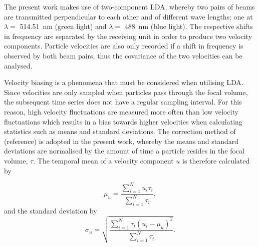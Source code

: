 \documentclass[12pt,oneside,a4paper]{article}
\begin{document}
The present work makes use of two-component LDA, whereby two pairs of beams are transmitted perpendicular to each other and of different wave lengths; one at $\lambda = $ \SI{514.51}{nm} (green light) and $\lambda = $ \SI{488}{nm} (blue light). The respective shifts in frequency are separated by the receiving unit in order to produce two velocity components. Particle velocities are also only recorded if a shift in frequency is observed by both beam pairs, thus the covariance of the two velocities can be analysed. 

Velocity biasing is a phenomena that must be considered when utilising LDA. Since velocities are only sampled when particles pass through the focal volume, the subsequent time series does not have a regular sampling interval. For this reason, high velocity fluctuations are measured more often than low velocity fluctuations which results in a bias towards higher velocities when calculating statistics such as means and standard deviations. The correction method of (reference) is adopted in the present work, whereby the means and standard deviations are normalised by the amount of time a particle resides in the focal volume, $\tau$. The temporal mean of a velocity component $u$ is therefore calculated by

\begin{equation}
\mu_u = \frac{\sum^N_{i=1} u_i \tau_i}{\sum^N_{i=1} \tau_i}, 
\end{equation}
and the standard deviation by
\begin{equation}
\sigma_u = \sqrt{\frac{\sum^N_{i=1} \tau_i (u_i - \mu_u)^2}{\sum^N_{i=1} \tau_i}}.
\end{equation}
\end{document}
